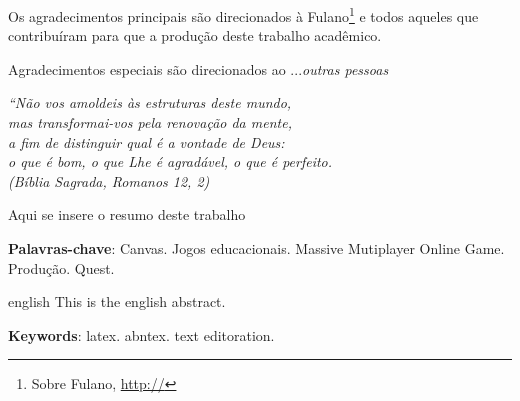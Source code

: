 \documentclass[
	12pt,				%
	openright,			%
	twoside,			%
	a4paper,			%
	english,			%
	french,				%
	spanish,			%
	brazil				%
	]{abntex2}
\begin{document}
\begin{agradecimentos}
Os agradecimentos principais são direcionados à Fulano\footnote{Sobre Fulano, \url{http://}} e todos aqueles que
contribuíram para que a produção deste trabalho acadêmico.

Agradecimentos especiais são direcionados ao ...\emph{outras pessoas}

\end{agradecimentos}

\begin{epigrafe}
    \vspace*{\fill}
	\begin{flushright}
		\textit{``Não vos amoldeis às estruturas deste mundo, \\
		mas transformai-vos pela renovação da mente, \\
		a fim de distinguir qual é a vontade de Deus: \\
		o que é bom, o que Lhe é agradável, o que é perfeito.\\
		(Bíblia Sagrada, Romanos 12, 2)}
	\end{flushright}
\end{epigrafe}


\setlength{\absparsep}{18pt} %
\begin{resumo}
Aqui se insere o resumo deste trabalho

 \textbf{Palavras-chave}: Canvas. Jogos educacionais. Massive Mutiplayer Online Game. Produção. Quest.
\end{resumo}

\begin{resumo}[Abstract]
 \begin{otherlanguage*}{english}
   This is the english abstract.

   \vspace{\onelineskip}
 
   \noindent 
   \textbf{Keywords}: latex. abntex. text editoration.
 \end{otherlanguage*}
\end{resumo}


\listoffigures*
\cleardoublepage

\listoftables*
\cleardoublepage
\end{document}

